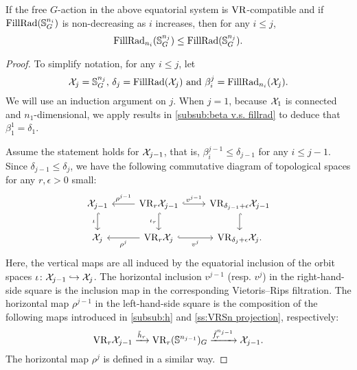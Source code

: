 \medskip\lemma If the free \(G\)-action in the above equatorial system is \(\mathrm{VR}\)-compatible and if $\operatorname{FillRad}(\mathbb{S}^{n_i}_G)$ is non-decreasing as \(i\) increases, then for any \(i \leq j\),
\[
\operatorname{FillRad}_{n_i}(\mathbb{S}^{n_j}_G) \leq \operatorname{FillRad}(\mathbb{S}^{n_j}_G).
\]

\begin{proof}
    To simplify notation, for any $i \leq j$, let
    \[
        \mathcal{X}_j = \mathbb{S}^{n_j}_G, \,\delta_j = \operatorname{FillRad}(\mathcal{X}_j) \text{ and }\beta_i^j = \operatorname{FillRad}_{n_i}(\mathcal{X}_j).
    \]
	We will use an induction argument on $j$.
	When $j = 1$, because $\mathcal{X}_1$ is connected and $n_1$-dimensional, we apply results in \cref{subsub:beta v.s. fillrad} to deduce that $\beta_1^1 = \delta_1$.

	Assume the statement holds for $\mathcal{X}_{j-1}$, that is, $\beta_i^{j-1} \leq \delta_{j-1}$ for any $i \leq j-1$.
	Since $\delta_{j-1} \leq \delta_j$, we have the following commutative diagram of topological spaces for any $r,\epsilon>0$ small:
    \begin{equation}\label{d:fundamental_bars_diagram}
        \begin{tikzcd}
            \cX_{j-1}
            \ar[d, hook,"{\iota}" left]
            &
            \VR_r\cX_{j-1}
            \ar[d, hook,"\iota_r" left]
            \ar[l, "\rho^{j-1}" above]
            \ar[r, hook, "v^{j-1}"]
            &
            \VR_{\delta_{j-1}+\epsilon}\cX_{j-1}
            \ar[d, hook]
            \\
            \cX_j
            &
            \VR_r\cX_j
            \ar[l, "\rho^j" below]
            \ar[r, hook, "v^j" below]
            &
            \VR_{\delta_j+\epsilon}\cX_j.
        \end{tikzcd}
    \end{equation}
    Here, the vertical maps are all induced by the equatorial inclusion of the orbit spaces $\iota \colon \mathcal{X}_{j-1} \hookrightarrow \mathcal{X}_j$.
    The horizontal inclusion $v^{j-1}$ (resp. $v^j$) in the right-hand-side square is the inclusion map in the corresponding Vietoris--Rips filtration.
    The horizontal map $\rho^{j-1}$ in the left-hand-side square is the composition of the following maps introduced in \cref{subsub:h} and \cref{ss:VRSn projection}, respectively:
    \[\mathrm{VR}_r\mathcal{X}_{j-1} \xrightarrow{\tilde{h}_r}\mathrm{VR}_r(\mathbb{S}^{n_{j-1}})_G \xrightarrow{\tilde{f}_r^{n_{j-1}}} \mathcal{X}_{j-1}.\]
    The horizontal map $\rho^j$ is defined in a similar way.


\end{proof}
